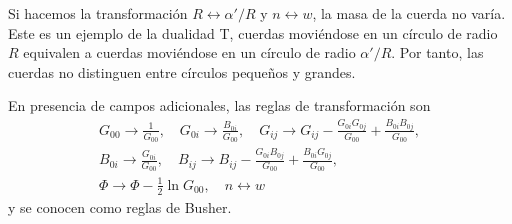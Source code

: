 Si hacemos la transformación $R\leftrightarrow \alpha'/R$ y $n\leftrightarrow w$, la
masa de la cuerda no varía. 
Este es un ejemplo de la dualidad T, cuerdas moviéndose en un círculo de radio $R$ equivalen
a cuerdas moviéndose en un círculo de radio $\alpha'/R$.
Por tanto, las cuerdas no distinguen entre círculos pequeños y grandes.

En presencia de campos adicionales, las reglas de transformación son
\begin{equation}
  \begin{gathered}
    G_{00}\to \frac{1}{G_{00}}, \quad G_{0i}\to \frac{B_{0i}}{G_{00}},\quad G_{ij}\to G_{ij} -\frac{G_{0i}G_{0j}}{G_{00}}+\frac{B_{0i}B_{0j}}{G_{00}}, \\
    B_{0i}\to\frac{G_{0i}}{G_{00}},\quad B_{ij}\to B_{ij}-\frac{G_{0i}B_{0j}}{G_{00}}+\frac{B_{0i}G_{0j}}{G_{00}},\\
    \Phi\to\Phi-\frac{1}{2}\ln G_{00},\quad n\leftrightarrow w
  \end{gathered}
\end{equation}
y se conocen como reglas de Busher.
